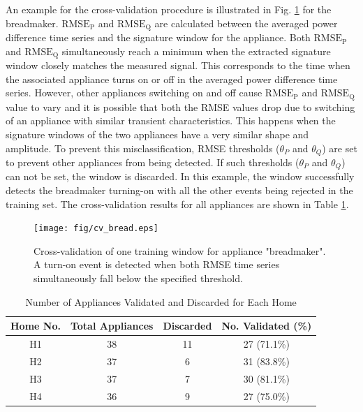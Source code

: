 \documentclass[conference]{IEEEtran}
\begin{document}
An example for the cross-validation procedure is illustrated in Fig. \ref{fig:bread} for the breadmaker.  $\text{RMSE}_{\text{P}}$ and $\text{RMSE}_{\text{Q}}$ are calculated between the averaged power difference time series and the signature window for the appliance. Both $\text{RMSE}_{\text{P}}$ and $\text{RMSE}_{\text{Q}}$ simultaneously reach a minimum when the extracted signature window closely matches the measured signal.  This corresponds to the time when the associated appliance turns on or off in the averaged power difference time series. However, other appliances switching on and off cause $\text{RMSE}_{\text{P}}$ and $\text{RMSE}_{\text{Q}}$ value to vary and it is possible that both the RMSE values drop due to switching of an appliance with similar transient characteristics.  This happens when the signature windows of the two appliances have a very similar shape and amplitude.  To prevent this misclassification, RMSE thresholds ($\theta_P$ and $\theta_Q$) are set to prevent other appliances from being detected.  If such thresholds ($\theta_P$ and $\theta_Q$) can not be set, the window is discarded.  In this example, the window successfully detects the breadmaker turning-on with all the other events being rejected in the training set.  The cross-validation results for all appliances are shown in Table \ref{table:cv}.  

\begin{figure}[!t]
	\centering
	\texttt{[image: fig/cv\_bread.eps]}
	\caption{Cross-validation of one training window for appliance "breadmaker". A turn-on event is detected when both RMSE time series simultaneously fall below the specified threshold. }
	\label{fig:bread}
\end{figure}

\begin{table}[!t]
	\renewcommand{\arraystretch}{1.2}
	\caption{Number of Appliances Validated and Discarded for Each Home}\label{classes}
	\label{table:cv}
	\centering
	\begin{tabular}{c||c||c||c}
		\hline 
		\textbf{Home No.} & \textbf{Total Appliances} &\textbf{Discarded} &\textbf{No. Validated (\%)}\tabularnewline
		\hline 
		\hline 
		H1 & 38 & 11 & 27 (71.1\%)\tabularnewline
		\hline 
		H2 & 37 & 6 & 31 (83.8\%)\tabularnewline
		\hline 
		H3 & 37 & 7 & 30 (81.1\%)\tabularnewline
		\hline 
		H4 & 36 & 9 & 27 (75.0\%)\tabularnewline
		\hline 
	\end{tabular}
\end{table}
\end{document}
